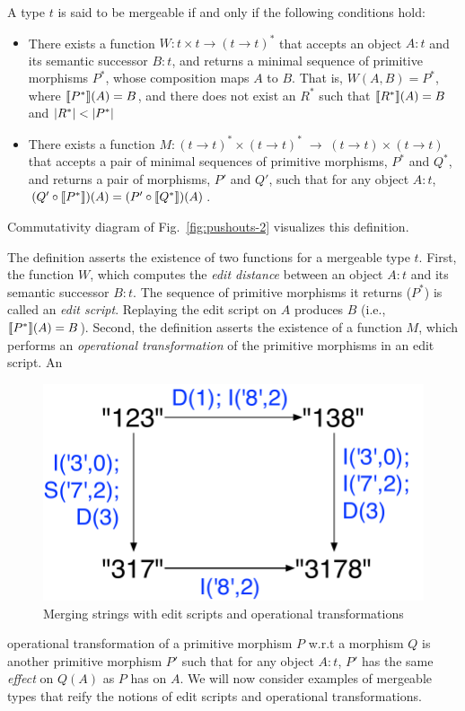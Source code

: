 \begin{definition} 
\label{def:mergeable-type-2}
A type $t$ is said to be mergeable if and only if the following
conditions hold:
\begin{itemize}
  \item There exists a function $W: t \times t \rightarrow (t
  \rightarrow t)^*$ that accepts an object $A:t$ and its
  semantic successor $B:t$, and returns a minimal sequence of
  primitive morphisms $P^*$, whose composition maps $A$ to $B$. That
  is, $W(A,B) = P^*$, where $\llbracket P^* \rrbracket(A) = B$, and there does not
  exist an $R^*$ such that $\llbracket R^* \rrbracket(A) = B$ and $\left|R^*\right| <
  \left|P^*\right|$

  \item There exists a function $M: (t \rightarrow t)^*\!\times\!(t
  \rightarrow t)^* \;\rightarrow\; (t \rightarrow t)\!\times\!(t
  \rightarrow t)$ that accepts a pair of minimal sequences of
  primitive morphisms, $P^*$ and $Q^*$, and returns a pair of morphisms,
  $P'$ and $Q'$, such that for any object $A:t$, $(Q' \circ
  \llbracket P^* \rrbracket)(A) = (P' \circ \llbracket Q^* \rrbracket)(A)$.  
\end{itemize}
Commutativity diagram of Fig.~\ref{fig:pushouts-2} visualizes this
definition. 
\end{definition}

The definition asserts the existence of two functions for a mergeable
type $t$. First, the function $W$, which computes the \emph{edit
distance} between an object $A:t$ and its semantic successor $B:t$.
The sequence of primitive morphisms it returns ($P^*$) is called an
\emph{edit script}. Replaying the edit script on $A$ produces $B$
(i.e., $\llbracket P^* \rrbracket(A) = B$). Second, the definition asserts the
existence of a function $M$, which performs an \emph{operational
transformation} of the primitive morphisms in an edit script. An
\begin{figure}
\centering
\includegraphics[scale=0.4]{Figures/string-eg}
\caption{Merging strings with edit scripts and operational
transformations}
\label{fig:string-eg}
\end{figure}
operational transformation of a primitive morphism $P$ w.r.t a
morphism $Q$ is another primitive morphism $P'$ such that for any
object $A:t$, $P'$ has the same \emph{effect} on $Q(A)$ as $P$ has on
$A$. We will now consider examples of mergeable types that reify the
notions of edit scripts and operational transformations.

